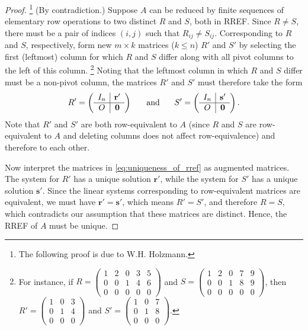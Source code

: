 \documentclass[12pt,letterpaper,reqno]{article}
\numberwithin{equation}{section}
\begin{document}
\begin{proof} \footnote{The following proof is due to W.H. Holzmann.}
	(By contradiction.) Suppose $A$ can be reduced by finite sequences of elementary row operations to two distinct $R$ and $S$, both in RREF. Since $R \neq S$, there must be a pair of indices $(i,j)$ such that $R_{ij} \neq S_{ij}$. Corresponding to $R$ and $S$, respectively, form new $m \times k$ matrices ($k \leq n$) $R'$ and $S'$ by selecting the first (leftmost) column for which $R$ and $S$ differ along with all pivot columns to the left of this column. \footnote{For instance, if $R=\begin{pmatrix}
		1 & 2 & 0 & 3 & 5 \\
		0 & 0 & 1 & 4 & 6 \\
		0 & 0 & 0 & 0 & 0
	\end{pmatrix}$ and $S=\begin{pmatrix}
		1 & 2 & 0 & 7 & 9 \\
		0 & 0 & 1 & 8 & 9 \\
		0 & 0 & 0 & 0 & 0
	\end{pmatrix}$, then $R'=\begin{pmatrix}
		1&0&3 \\ 0 & 1 & 4 \\ 0 & 0 & 0
	\end{pmatrix}$ and $S'=\begin{pmatrix}
		1&0&7 \\ 0 & 1 & 8 \\ 0 & 0 & 0
	\end{pmatrix}$.} Noting that the leftmost column in which $R$ and $S$ differ must be a non-pivot column, the matrices $R'$ and $S'$ must therefore take the form
	\begin{equation}\label{eq:uniqueness_of_rref}
		R'=
  \left(\begin{array}{c|c}
    I_n & \mathbf{r'} \\ \hline
    O & \mathbf{0} 
  \end{array}\right) \hspace{0.5cm} \text{ and } \hspace{0.5cm} S'=
  \left(\begin{array}{c|c}
    I_n & \mathbf{s'} \\ \hline
    O & \mathbf{0} 
  \end{array}\right).
\end{equation}
Note that $R'$ and $S'$ are both row-equivalent to $A$ (since $R$ and $S$ are row-equivalent to $A$ and deleting columns does not affect row-equivalence) and therefore to each other. 

Now interpret the matrices in \eqref{eq:uniqueness_of_rref} as augmented matrices. The system for $R'$ has a unique solution $\mathbf{r'}$, while the system for $S'$ has a unique solution $\mathbf{s'}$. Since the linear systems corresponding to row-equivalent matrices are equivalent, we must have $\mathbf{r'}=\mathbf{s'}$, which means $R'=S'$, and therefore $R=S$, which contradicts our assumption that these matrices are distinct. Hence, the RREF of $A$ must be unique.
\end{proof}
\end{document}
